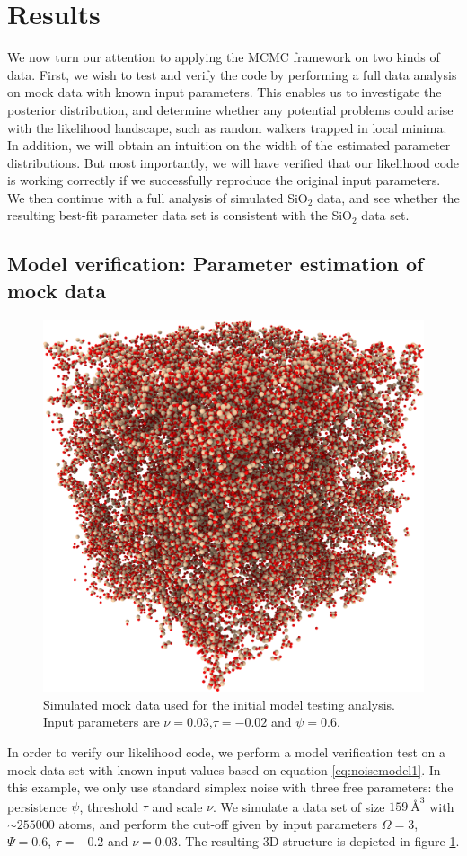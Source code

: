 \documentclass[aps,pre,twocolumn,letterpaper,floatfix,showpacs]{revtex4}
\begin{document}
\section{Results}
We now turn our attention to applying the MCMC framework on two kinds of data.
First, we wish to test and verify the code by performing a full data analysis on
mock data with known input parameters. This enables us to investigate the posterior
distribution, and determine whether any potential problems could arise with the
likelihood landscape, such as random walkers trapped in local minima. In addition,
we will obtain an intuition on the width of the estimated parameter distributions.
But most importantly, we will have verified that our likelihood code is working correctly
if we successfully reproduce the original input parameters. We then continue with a
full analysis of simulated SiO$_2$ data, and see whether the resulting best-fit
parameter data set is consistent with the SiO$_2$ data set. 

\subsection{Model verification: Parameter estimation of mock data}
\begin{figure}[htb!]
\includegraphics[width=.45\textwidth]{model_test.png}
\caption{Simulated mock data used for the initial model testing analysis. Input parameters are $\nu=0.03$,$\tau=-0.02$ and $\psi=0.6$.}
\label{fig:mockdata}
\end{figure}
In order to verify our likelihood code, we perform a model verification test
on a mock data set with known input values based on equation \ref{eq:noisemodel1}.
In this example, we only use standard simplex noise with three free parameters:
the persistence $\psi$, threshold $\tau$ and scale $\nu$. We simulate a data set
of size $\SI{159} {\angstrom}^3$ with $\sim 255 000$ atoms, and perform the cut-off
given by input parameters $\Omega=3$, $\Psi = 0.6$, $\tau=-0.2$ and $\nu=0.03$.
The resulting 3D structure is depicted in figure \ref{fig:mockdata}. 
\end{document}
